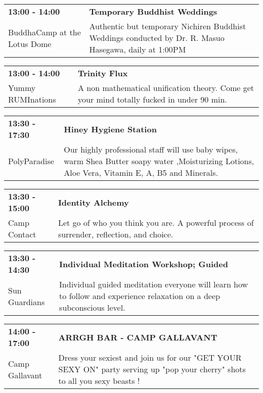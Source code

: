 \begin{tabular}{ p{1in} p{2.2in} }
    \textbf{13:00 - 14:00} & \textbf{Temporary Buddhist Weddings} \\
    BuddhaCamp at the Lotus Dome \newline  & Authentic but temporary Nichiren Buddhist Weddings conducted by Dr. R. Masuo Hasegawa, daily at 1:00PM \\
    \hline 
\end{tabular}
    
\begin{tabular}{ p{1in} p{2.2in} }
    \textbf{13:00 - 14:00} & \textbf{Trinity Flux} \\
    Yummy RUMInations \newline  & A non mathematical unification theory.  Come get your mind totally fucked in under 90 min. \\
    \hline 
\end{tabular}
    
\begin{tabular}{ p{1in} p{2.2in} }
    \textbf{13:30 - 17:30} & \textbf{Hiney Hygiene Station} \\
    PolyParadise \newline  & Our highly professional staff  will use baby wipes, warm Shea Butter soapy water ,Moisturizing Lotions, Aloe Vera, Vitamin E, A, B5 and Minerals. \\
    \hline 
\end{tabular}
    
\begin{tabular}{ p{1in} p{2.2in} }
    \textbf{13:30 - 15:00} & \textbf{Identity Alchemy} \\
    Camp Contact \newline  & Let go of who you think you are. A powerful process of surrender, reflection, and choice. \\
    \hline 
\end{tabular}
    
\begin{tabular}{ p{1in} p{2.2in} }
    \textbf{13:30 - 14:30} & \textbf{Individual Meditation Workshop; Guided} \\
    Sun Guardians \newline  & Individual guided meditation everyone will learn how to follow and experience relaxation on a deep subconscious level. \\
    \hline 
\end{tabular}
    
\begin{tabular}{ p{1in} p{2.2in} }
    \textbf{14:00 - 17:00} & \textbf{ARRGH BAR - CAMP GALLAVANT} \\
    Camp Gallavant \newline  & Dress your sexiest and join us for our "GET YOUR SEXY ON" party serving up "pop your cherry" shots to all you sexy beasts ! \\
    \hline 
\end{tabular}
    
